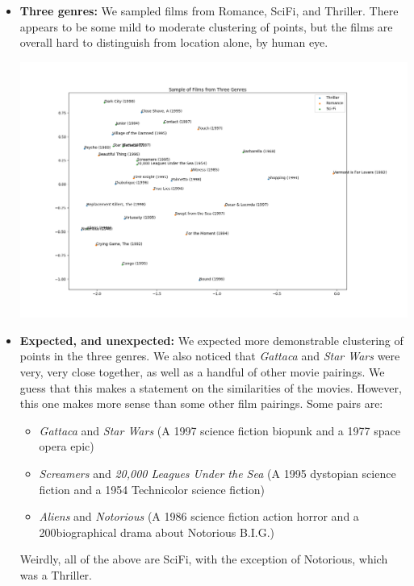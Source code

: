 \begin{itemize}
\begin{center}
  \end{center}
  \item \textbf{Three genres:} We sampled films from Romance, SciFi, and Thriller. There appears to be some mild to moderate clustering of points, but the films are overall hard to distinguish from location alone, by human eye.
  \begin{center}
    \includegraphics[scale=.45]{mat_fac_4.png}
  \end{center}
  \item \textbf{Expected, and unexpected:} We expected more demonstrable clustering of points in the three genres. We also noticed that \textit{Gattaca} and \textit{Star Wars} were very, very close together, as well as a handful of other movie pairings. We guess that this makes a statement on the similarities of the movies. However, this one makes more sense than some other film pairings. Some pairs are:
  \begin{itemize}
    \item \textit{Gattaca} and \textit{Star Wars} (A 1997 science fiction biopunk and a 1977 space opera epic)
    \item \textit{Screamers} and \textit{20,000 Leagues Under the Sea} (A 1995 dystopian science fiction and a 1954 Technicolor science fiction)
    \item \textit{Aliens} and \textit{Notorious} (A 1986 science fiction action horror and a 200biographical drama about Notorious B.I.G.)
  \end{itemize}
  Weirdly, all of the above are SciFi, with the exception of Notorious, which was a Thriller.
\end{itemize}



